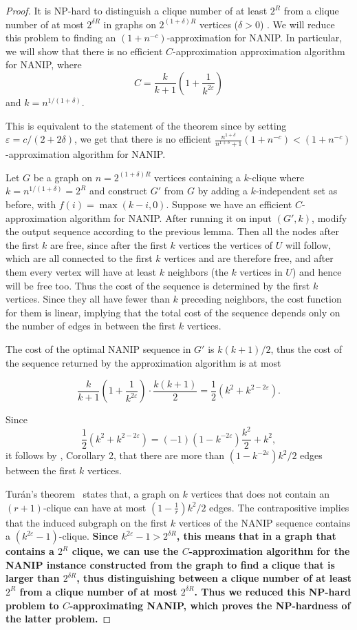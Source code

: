 \documentclass[english]{llncs}
\def\eps{\varepsilon}
\newcommand{\chg}[1]{\textbf{\color{red} #1}}
\begin{document}
\begin{proof}
It is NP-hard to distinguish a clique number of at least $2^R$ from a clique
number of at most $2^{\delta R}$ in graphs on $2^{(1+\delta)R}$ vertices ($\delta>0$)
\cite{Zuckerman06}.  We will reduce this problem to finding an
$(1+n^{-c})$-approximation for NANIP.  In particular, we will show that there
is no efficient $C$-approximation approximation algorithm for NANIP, where $$ C
= \frac{k}{k+1} \left ( 1 + \frac{1}{k^{2\varepsilon}} \right ) $$ and
$k=n^{1/(1+\delta)}$.

This is equivalent to the statement of the theorem since by setting
$\eps=c/(2+2\delta)$, we get that there is no efficient
$\frac{n^{1+\delta}}{n^{1+\delta}+1}(1+n^{-c})<(1+n^{-c})$-approximation
algorithm for NANIP.

Let $G$ be a graph on $n=2^{(1+\delta)R}$ vertices containing a $k$-clique
where $k=n^{1/(1+\delta)}=2^R$ and construct $G'$ from $G$ by adding a
$k$-independent set as before, with $f(i)=\max(k-i, 0)$. Suppose we have an
efficient $C$-approximation algorithm for NANIP. After running it on input
$(G', k)$, modify the output sequence according to the previous lemma. Then all
the nodes after the first $k$ are free, since after the first $k$ vertices the
vertices of $U$ will follow, which are all connected to the first $k$ vertices
and are therefore free, and after them every vertex will have at least $k$ neighbors
(the $k$ vertices in $U$) and hence will be free too.
Thus the cost of the sequence is
determined by the first $k$ vertices. Since they all have fewer than $k$
preceding neighbors, the cost function for them is linear, implying that the
total cost of the sequence depends only on the number of edges in between the
first $k$ vertices.

The cost of the optimal NANIP sequence in $G'$ is $k(k+1)/2$, thus the cost of
the sequence returned by the approximation algorithm is at most

$$ \frac{k}{k+1}\left(1+\frac{1}{k^{2\eps}}\right)\cdot \frac{k(k+1)}{2} =
\frac12(k^2+k^{2-2\eps}).$$

Since $$\frac12(k^2+k^{2-2\eps})=(-1)(1-k^{-2\eps})\frac{k^2}{2}+k^2,$$ it
follows by \cite{Gutfraind14}, Corollary 2, that there are more than
$(1-k^{-2\eps})k^2/2$ edges between the first $k$ vertices.

Tur\'an's theorem~\cite{Turan1941} states that, a graph on $k$ vertices that
does not contain an $(r+1)$-clique can have at most $(1-\frac1r)k^2/2$ edges.
The contrapositive implies that the induced subgraph on the first $k$ vertices
of the NANIP sequence contains a $(k^{2\eps}-1)$-clique.  \chg{Since $k^{2\eps}-1>
2^{\delta R}$, this means that in a graph that contains a $2^R$ clique,
we can use the $C$-approximation algorithm for the NANIP instance constructed
from the graph to find a clique that is larger than $2^{\delta R}$,
thus distinguishing between a clique number of at least $2^R$ from a clique
number of at most $2^{\delta R}$. Thus we reduced this NP-hard problem
to $C$-approximating NANIP, which proves the NP-hardness of the latter problem.}
\end{proof}
\end{document}
